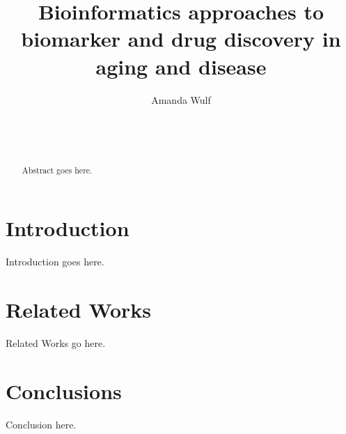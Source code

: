 \documentclass{sig-alternate-05-2015}
\begin{document}
\title{Bioinformatics approaches to biomarker and drug discovery in aging and disease}
\author{
\alignauthor
Amanda Wulf\\
       \\
       \\
       \\
}
\maketitle
\begin{abstract}
Abstract goes here.
\end{abstract}

\section{Introduction}
Introduction goes here.

\section{Related Works}
Related Works go here.

\section{Conclusions}
Conclusion here.
\end{document}
